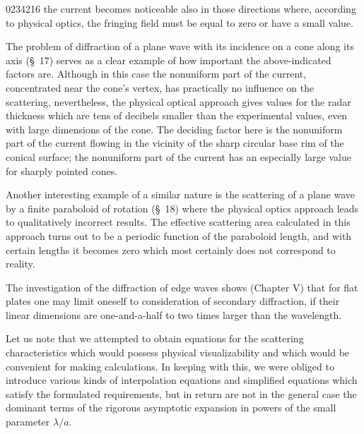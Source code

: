 \begin{scanpage}{0234}{216}
\noindent the current becomes noticeable also in those directions where, according to physical optics, the fringing field must be equal to zero or have a small value.

The problem of diffraction of a plane wave with its incidence on a cone along its axis (\S\ 17) serves as a clear example of how important the above-indicated factors are. Although in this case the nonuniform part of the current, concentrated near the cone's vertex, has practically no influence on the scattering, nevertheless, the physical optical approach gives values for the radar thickness which are tens of decibels smaller than the experimental values, even with large dimensions of the cone. The deciding factor here is the nonuniform part of the current flowing in the vicinity of the sharp circular base rim of the conical surface; the nonuniform part of the current has an especially large value for sharply pointed cones.

Another interesting example of a similar nature is the scattering of a plane wave by a finite paraboloid of rotation (\S\ 18) where the physical optics approach leads to qualitatively incorrect results. The effective scattering area calculated in this approach turns out to be a periodic function of the paraboloid length, and with certain lengths it becomes zero which most certainly does not correspond to reality.

The investigation of the diffraction of edge waves shows (Chapter V) that for flat plates one may limit oneself to consideration of secondary diffraction, if their linear dimensions are one-and-a-half to two times larger than the wavelength.

Let us note that we attempted to obtain equations for the scattering characteristics which would possess physical visualizability and which would be convenient for making calculations. In keeping with this, we were obliged to introduce various kinds of interpolation equations and simplified equations which satisfy the formulated requirements, but in return are not in the general case the dominant terms of the rigorous asymptotic expansion in powers of the small parameter $\lambda/a$.
\end{scanpage}
